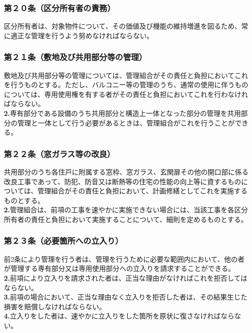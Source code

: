 \documentclass[12pt,uplatex]{jsarticle}
\begin{document}
\subsubsection*{第２０条（区分所有者の責務）}
区分所有者は、対象物件について、その価値及び機能の維持増進を図るため、常に適正な管理を行うよう努めなければならない。
\subsubsection*{第２１条（敷地及び共用部分等の管理）}
敷地及び共用部分等の管理については、管理組合がその責任と負担においてこれを行うものとする。ただし、バルコニー等の管理のうち、通常の使用に伴うものについては、専用使用権を有する者がその責任と負担においてこれを行わなければならない。\\
\textbf{2.}専有部分である設備のうち共用部分と構造上一体となった部分の管理を共用部分の管理と一体として行う必要があるときは、管理組合がこれを行うことができる。
\subsubsection*{第２２条（窓ガラス等の改良）}
共用部分のうち各住戸に附属する窓枠、窓ガラス、玄関扉その他の開口部に係る改良工事であって、防犯、防音又は断熱等の住宅の性能の向上等に資するものについては、管理組合がその責任と負担において、計画修繕としてこれを実施するものとする。\\
\textbf{2.}管理組合は、前項の工事を速やかに実施できない場合には、当該工事を各区分所有者の責任と負担において実施することについて、細則を定めるものとする。
\subsubsection*{第２３条（必要箇所への立入り）}
前2条により管理を行う者は、管理を行うために必要な範囲内において、他の者が管理する専有部分又は専用使用部分への立入りを請求することができる。\\
\textbf{2.}前項により立入りを請求された者は、正当な理由がなければこれを拒否してはならない。\\
\textbf{3.}前項の場合において、正当な理由なく立入りを拒否した者は、その結果生じた損害を賠償しなければならない。\\
\textbf{4.}立入りをした者は、速やかに立入りをした箇所を原状に復さなければならない。
\end{document}
